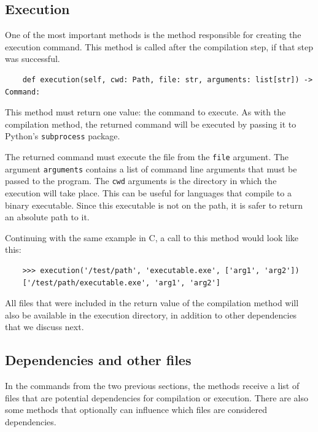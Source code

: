 \documentclass[../main]{subfiles}
\begin{document}
\subsection{Execution}\label{subsec:impl-execution}

One of the most important methods is the method responsible for creating the execution command.
This method is called after the compilation step, if that step was successful.

\begin{verbatim}
    def execution(self, cwd: Path, file: str, arguments: list[str]) -> Command:
\end{verbatim}

This method must return one value: the command to execute.
As with the compilation method, the returned command will be executed by passing it to Python's \texttt{subprocess} package.

The returned command must execute the file from the \texttt{file} argument.
The argument \texttt{arguments} contains a list of command line arguments that must be passed to the program.
The \texttt{cwd} arguments is the directory in which the execution will take place.
This can be useful for languages that compile to a binary executable.
Since this executable is not on the path, it is safer to return an absolute path to it.

Continuing with the same example in C, a call to this method would look like this:

\begin{verbatim}
    >>> execution('/test/path', 'executable.exe', ['arg1', 'arg2'])
    ['/test/path/executable.exe', 'arg1', 'arg2']
\end{verbatim}

All files that were included in the return value of the compilation method will also be available in the execution directory, in addition to other dependencies that we discuss next.

\subsection{Dependencies and other files}\label{subsec:dependencies-and-other-files}

In the commands from the two previous sections, the methods receive a list of files that are potential dependencies for compilation or execution.
There are also some methods that optionally can influence which files are considered dependencies.
\end{document}

